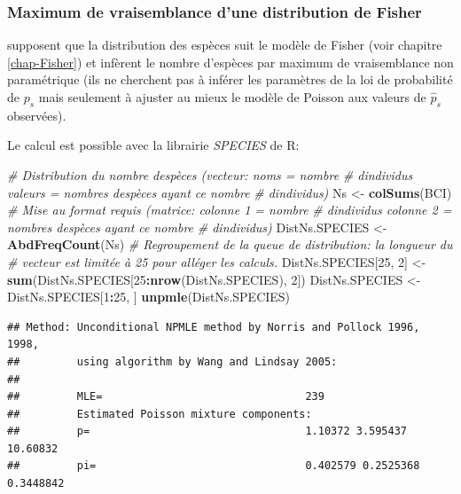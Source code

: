 \documentclass[
  11pt,
  french,
  a4paper,
  extrafontsizes,onecolumn,openright
  ]{memoir}
\newenvironment{Shaded}{\begin{snugshade}}{\end{snugshade}}
\newcommand{\CommentTok}[1]{\textcolor[rgb]{0.56,0.35,0.01}{\textit{#1}}}
\newcommand{\DecValTok}[1]{\textcolor[rgb]{0.00,0.00,0.81}{#1}}
\newcommand{\FunctionTok}[1]{\textcolor[rgb]{0.13,0.29,0.53}{\textbf{#1}}}
\newcommand{\NormalTok}[1]{#1}
\newcommand{\OtherTok}[1]{\textcolor[rgb]{0.56,0.35,0.01}{#1}}
\newcommand{\SpecialCharTok}[1]{\textcolor[rgb]{0.81,0.36,0.00}{\textbf{#1}}}
\begin{document}
\normalsize

\subsubsection{Maximum de vraisemblance d'une distribution de Fisher}\label{maximum-de-vraisemblance-dune-distribution-de-fisher}

\textcite{Norris1998} supposent que la distribution des espèces suit le modèle de Fisher (voir chapitre \ref{chap-Fisher}) et infèrent le nombre d'espèces par maximum de vraisemblance non paramétrique (ils ne cherchent pas à inférer les paramètres de la loi de probabilité de \(p_s\) mais seulement à ajuster au mieux le modèle de Poisson aux valeurs de \({\hat{p}}_s\) observées).

Le calcul est possible avec la librairie \emph{SPECIES} de R:

\scriptsize

\begin{Shaded}
\begin{Highlighting}[]
\CommentTok{\# Distribution du nombre d\textquotesingle{}espèces (vecteur: noms = nombre}
\CommentTok{\# d\textquotesingle{}individus valeurs = nombres d\textquotesingle{}espèces ayant ce nombre}
\CommentTok{\# d\textquotesingle{}individus)}
\NormalTok{Ns }\OtherTok{\textless{}{-}} \FunctionTok{colSums}\NormalTok{(BCI)}
\CommentTok{\# Mise au format requis (matrice: colonne 1 = nombre}
\CommentTok{\# d\textquotesingle{}individus colonne 2 = nombres d\textquotesingle{}espèces ayant ce nombre}
\CommentTok{\# d\textquotesingle{}individus)}
\NormalTok{DistNs.SPECIES }\OtherTok{\textless{}{-}} \FunctionTok{AbdFreqCount}\NormalTok{(Ns)}
\CommentTok{\# Regroupement de la queue de distribution: la longueur du}
\CommentTok{\# vecteur est limitée à 25 pour alléger les calculs.}
\NormalTok{DistNs.SPECIES[}\DecValTok{25}\NormalTok{, }\DecValTok{2}\NormalTok{] }\OtherTok{\textless{}{-}} \FunctionTok{sum}\NormalTok{(DistNs.SPECIES[}\DecValTok{25}\SpecialCharTok{:}\FunctionTok{nrow}\NormalTok{(DistNs.SPECIES),}
    \DecValTok{2}\NormalTok{])}
\NormalTok{DistNs.SPECIES }\OtherTok{\textless{}{-}}\NormalTok{ DistNs.SPECIES[}\DecValTok{1}\SpecialCharTok{:}\DecValTok{25}\NormalTok{, ]}
\FunctionTok{unpmle}\NormalTok{(DistNs.SPECIES)}
\end{Highlighting}
\end{Shaded}

\begin{verbatim}
## Method: Unconditional NPMLE method by Norris and Pollock 1996, 1998, 
##         using algorithm by Wang and Lindsay 2005: 
## 
##         MLE=                                239 
##         Estimated Poisson mixture components:       
##         p=                                  1.10372 3.595437 10.60832 
##         pi=                                 0.402579 0.2525368 0.3448842
\end{verbatim}
\end{document}
